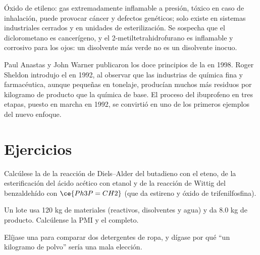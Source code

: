\begin{safety}{}
Óxido de etileno: gas extremadamente inflamable a presión, tóxico en caso de inhalación, puede
provocar cáncer y defectos genéticos; solo existe en sistemas industriales cerrados
y en unidades de esterilización. Se sospecha que el diclorometano es cancerígeno, y el
2-metiltetrahidrofurano es inflamable y corrosivo para los ojos: un disolvente más verde
no es un disolvente inocuo.
\end{safety}

\begin{history}
Paul Anastas y John Warner publicaron los doce principios de la  en 1998. Roger Sheldon introdujo el  en 1992, al observar que
las industrias de química fina y farmacéutica, aunque pequeñas en tonelaje,
producían muchos más residuos por kilogramo de producto que la química de base. El
proceso del ibuprofeno en tres etapas, puesto en marcha en 1992, se convirtió en uno de los primeros
ejemplos del nuevo enfoque.
\end{history}

\section{Ejercicios}

\begin{exercise}[$\star$]\label{exo:b3:green-industrial:1}
Calcúlese la  de la reacción de Diels--Alder del butadieno con el eteno, de
la esterificación del ácido acético con etanol y de la reacción de Wittig del
benzaldehído con $\ce{Ph3P=CH2}$ (que da estireno y óxido de trifenilfosfina).
\end{exercise}

\begin{exercise}[$\star$]\label{exo:b3:green-industrial:2}
Un lote usa 120 kg de materiales (reactivos, disolventes y agua) y da 8.0 kg de
producto. Calcúlense la PMI y el  completo.
\end{exercise}

\begin{exercise}[$\star$]\label{exo:b3:green-industrial:3}
Elíjase una  para comparar dos detergentes de ropa, y dígase por qué
``un kilogramo de polvo'' sería una mala elección.
\end{exercise}

